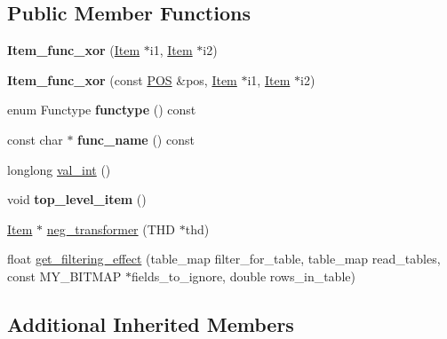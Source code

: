 \subsection*{Public Member Functions}
\begin{DoxyCompactItemize}
\item 
\mbox{\label{classItem__func__xor_ab8d2de292d0b34c844a799f80143b57d}} 
{\bfseries Item\+\_\+func\+\_\+xor} (\mbox{\hyperlink{classItem}{Item}} $\ast$i1, \mbox{\hyperlink{classItem}{Item}} $\ast$i2)
\item 
\mbox{\label{classItem__func__xor_aa85b0600d4be791d940db59fbee7d99e}} 
{\bfseries Item\+\_\+func\+\_\+xor} (const \mbox{\hyperlink{structYYLTYPE}{P\+OS}} \&pos, \mbox{\hyperlink{classItem}{Item}} $\ast$i1, \mbox{\hyperlink{classItem}{Item}} $\ast$i2)
\item 
\mbox{\label{classItem__func__xor_a0965af7e1dec81a2cdc18be092104e79}} 
enum Functype {\bfseries functype} () const
\item 
\mbox{\label{classItem__func__xor_a1bcfdf20e27f49caa98b71f3a7c546e0}} 
const char $\ast$ {\bfseries func\+\_\+name} () const
\item 
longlong \mbox{\hyperlink{classItem__func__xor_abf20b3f1b71cb4c4b588c5a04d77ba05}{val\+\_\+int}} ()
\item 
\mbox{\label{classItem__func__xor_afdd5e5f01dc7a0760b7ce87c6f0053fb}} 
void {\bfseries top\+\_\+level\+\_\+item} ()
\item 
\mbox{\hyperlink{classItem}{Item}} $\ast$ \mbox{\hyperlink{classItem__func__xor_a8a1833fa47e41da3c73e32912f91b768}{neg\+\_\+transformer}} (T\+HD $\ast$thd)
\item 
float \mbox{\hyperlink{classItem__func__xor_abd4e66123ec93ceb67d18b756c1c2720}{get\+\_\+filtering\+\_\+effect}} (table\+\_\+map filter\+\_\+for\+\_\+table, table\+\_\+map read\+\_\+tables, const M\+Y\+\_\+\+B\+I\+T\+M\+AP $\ast$fields\+\_\+to\+\_\+ignore, double rows\+\_\+in\+\_\+table)
\end{DoxyCompactItemize}
\subsection*{Additional Inherited Members}


